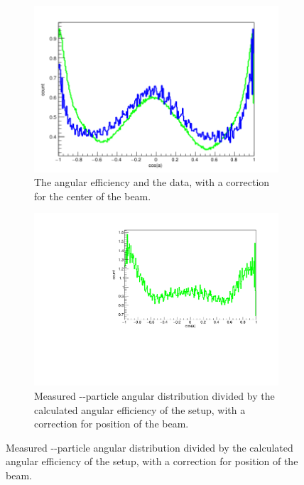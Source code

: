 \begin{figure}[h]
	\begin{subfigure}[]{.5\linewidth}
		\centering
		\includegraphics[width=\linewidth]{../figures/centerCorrections/try-3-30.png}
		\caption{The angular efficiency and the data, with a correction for the center of the beam. }
		\label{fig:centerCorrection}
	\end{subfigure}
	\begin{subfigure}[]{.5\linewidth}
		\centering
		\includegraphics[width=\linewidth]{../figures/betaAngles/dataDivEffCenterCorrected.pdf}
		\caption{Measured \be-\al-particle angular distribution divided by the calculated angular efficiency of the setup, with a correction for position of the beam. }
		\label{fig:dataDivEffCenter}
	\end{subfigure}
\end{figure}



